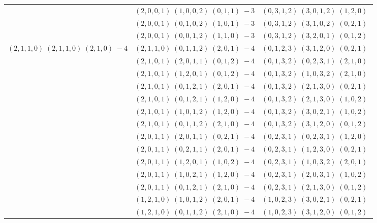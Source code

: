 \documentclass[11pt]{article}
\begin{document}
\begin{longtable}[l]{|c|c|c|}
 \cline{2-3} 
 & $(2 ,0 ,0 ,1) \;(1 ,0 ,0 ,2) \;(0 ,1 ,1) \;-3$ & $(0 ,3 ,1 ,2) \;(3 ,0 ,1 ,2) \;(1 ,2 ,0) \;$\\ 
 \cline{2-3} 
 & $(2 ,0 ,0 ,1) \;(0 ,1 ,0 ,2) \;(1 ,0 ,1) \;-3$ & $(0 ,3 ,1 ,2) \;(3 ,1 ,0 ,2) \;(0 ,2 ,1) \;$\\ 
 \cline{2-3} 
 & $(2 ,0 ,0 ,1) \;(0 ,0 ,1 ,2) \;(1 ,1 ,0) \;-3$ & $(0 ,3 ,1 ,2) \;(3 ,2 ,0 ,1) \;(0 ,1 ,2) \;$\\ \hline\multirow[t]{19}{*}{ $(2 ,1 ,1 ,0) \;(2 ,1 ,1 ,0) \;(2 ,1 ,0) \;-4$ }  & $(2 ,1 ,1 ,0) \;(0 ,1 ,1 ,2) \;(2 ,0 ,1) \;-4$ & $(0 ,1 ,2 ,3) \;(3 ,1 ,2 ,0) \;(0 ,2 ,1) \;$\\ 
 \cline{2-3} 
 & $(2 ,1 ,0 ,1) \;(2 ,0 ,1 ,1) \;(0 ,1 ,2) \;-4$ & $(0 ,1 ,3 ,2) \;(0 ,2 ,3 ,1) \;(2 ,1 ,0) \;$\\ 
 \cline{2-3} 
 & $(2 ,1 ,0 ,1) \;(1 ,2 ,0 ,1) \;(0 ,1 ,2) \;-4$ & $(0 ,1 ,3 ,2) \;(1 ,0 ,3 ,2) \;(2 ,1 ,0) \;$\\ 
 \cline{2-3} 
 & $(2 ,1 ,0 ,1) \;(0 ,1 ,2 ,1) \;(2 ,0 ,1) \;-4$ & $(0 ,1 ,3 ,2) \;(2 ,1 ,3 ,0) \;(0 ,2 ,1) \;$\\ 
 \cline{2-3} 
 & $(2 ,1 ,0 ,1) \;(0 ,1 ,2 ,1) \;(1 ,2 ,0) \;-4$ & $(0 ,1 ,3 ,2) \;(2 ,1 ,3 ,0) \;(1 ,0 ,2) \;$\\ 
 \cline{2-3} 
 & $(2 ,1 ,0 ,1) \;(1 ,0 ,1 ,2) \;(1 ,2 ,0) \;-4$ & $(0 ,1 ,3 ,2) \;(3 ,0 ,2 ,1) \;(1 ,0 ,2) \;$\\ 
 \cline{2-3} 
 & $(2 ,1 ,0 ,1) \;(0 ,1 ,1 ,2) \;(2 ,1 ,0) \;-4$ & $(0 ,1 ,3 ,2) \;(3 ,1 ,2 ,0) \;(0 ,1 ,2) \;$\\ 
 \cline{2-3} 
 & $(2 ,0 ,1 ,1) \;(2 ,0 ,1 ,1) \;(0 ,2 ,1) \;-4$ & $(0 ,2 ,3 ,1) \;(0 ,2 ,3 ,1) \;(1 ,2 ,0) \;$\\ 
 \cline{2-3} 
 & $(2 ,0 ,1 ,1) \;(0 ,2 ,1 ,1) \;(2 ,0 ,1) \;-4$ & $(0 ,2 ,3 ,1) \;(1 ,2 ,3 ,0) \;(0 ,2 ,1) \;$\\ 
 \cline{2-3} 
 & $(2 ,0 ,1 ,1) \;(1 ,2 ,0 ,1) \;(1 ,0 ,2) \;-4$ & $(0 ,2 ,3 ,1) \;(1 ,0 ,3 ,2) \;(2 ,0 ,1) \;$\\ 
 \cline{2-3} 
 & $(2 ,0 ,1 ,1) \;(1 ,0 ,2 ,1) \;(1 ,2 ,0) \;-4$ & $(0 ,2 ,3 ,1) \;(2 ,0 ,3 ,1) \;(1 ,0 ,2) \;$\\ 
 \cline{2-3} 
 & $(2 ,0 ,1 ,1) \;(0 ,1 ,2 ,1) \;(2 ,1 ,0) \;-4$ & $(0 ,2 ,3 ,1) \;(2 ,1 ,3 ,0) \;(0 ,1 ,2) \;$\\ 
 \cline{2-3} 
 & $(1 ,2 ,1 ,0) \;(1 ,0 ,1 ,2) \;(2 ,0 ,1) \;-4$ & $(1 ,0 ,2 ,3) \;(3 ,0 ,2 ,1) \;(0 ,2 ,1) \;$\\ 
 \cline{2-3} 
 & $(1 ,2 ,1 ,0) \;(0 ,1 ,1 ,2) \;(2 ,1 ,0) \;-4$ & $(1 ,0 ,2 ,3) \;(3 ,1 ,2 ,0) \;(0 ,1 ,2) \;$\\ 

\end{longtable}
\end{document}
